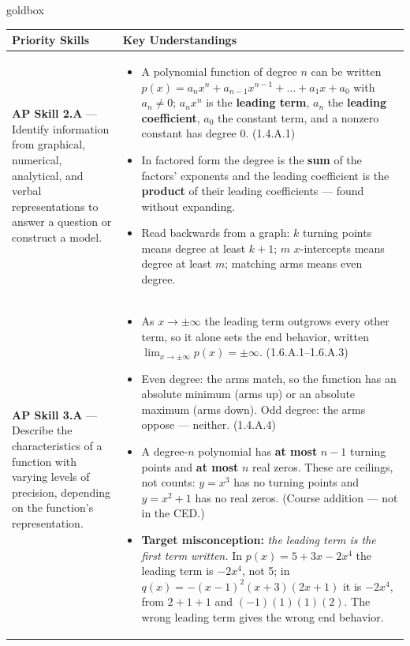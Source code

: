 \documentclass[10pt]{article}
\begin{document}
\renewcommand{\arraystretch}{1.6}
\begin{skillbox}{goldbox}
\begin{tabularx}{\linewidth}{@{}X X@{}}
\textbf{Priority Skills} &
\textbf{Key Understandings} \\
\midrule
\textbf{AP Skill 2.A} --- Identify information from graphical, numerical, analytical, and
verbal representations to answer a question or construct a model. &
\begin{itemize}[leftmargin=1.2em,itemsep=2pt,topsep=0pt]
  \item A polynomial function of degree $n$ can be written
        $p(x) = a_n x^n + a_{n-1}x^{n-1} + \dots + a_1 x + a_0$ with $a_n \ne 0$; $a_n x^n$
        is the \textbf{leading term}, $a_n$ the \textbf{leading coefficient}, $a_0$ the
        constant term, and a nonzero constant has degree 0. (1.4.A.1)
  \item In factored form the degree is the \textbf{sum} of the factors' exponents and the
        leading coefficient is the \textbf{product} of their leading coefficients --- found
        without expanding.
  \item Read backwards from a graph: $k$ turning points means degree at least $k + 1$;
        $m$ $x$-intercepts means degree at least $m$; matching arms means even degree.
\end{itemize} \\
\textbf{AP Skill 3.A} --- Describe the characteristics of a function with varying levels of
precision, depending on the function's representation. &
\begin{itemize}[leftmargin=1.2em,itemsep=2pt,topsep=0pt]
  \item As $x \to \pm\infty$ the leading term outgrows every other term, so it alone sets the
        end behavior, written $\lim_{x \to \pm\infty} p(x) = \pm\infty$. (1.6.A.1--1.6.A.3)
  \item Even degree: the arms match, so the function has an absolute minimum (arms up) or an
        absolute maximum (arms down). Odd degree: the arms oppose --- neither. (1.4.A.4)
  \item A degree-$n$ polynomial has \textbf{at most} $n - 1$ turning points and \textbf{at
        most} $n$ real zeros. These are ceilings, not counts: $y = x^3$ has no turning points
        and $y = x^2 + 1$ has no real zeros. (Course addition --- not in the CED.)
  \item \textbf{Target misconception:} \emph{the leading term is the first term written.}
        In $p(x) = 5 + 3x - 2x^4$ the leading term is $-2x^4$, not 5; in
        $q(x) = -(x-1)^2(x+3)(2x+1)$ it is $-2x^4$, from $2 + 1 + 1$ and $(-1)(1)(1)(2)$.
        The wrong leading term gives the wrong end behavior.
\end{itemize} \\
\end{tabularx}
\end{skillbox}
\end{document}
